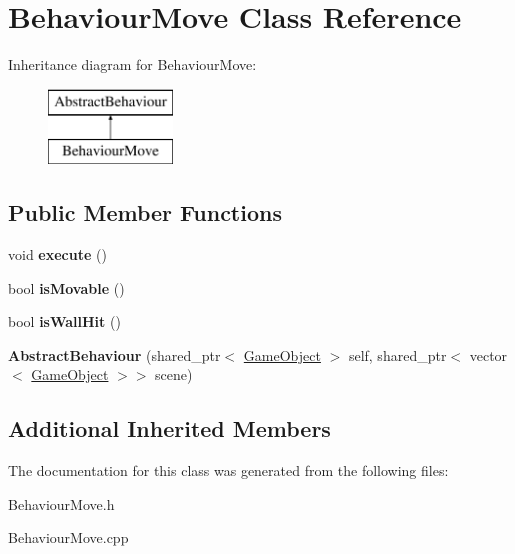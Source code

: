 \hypertarget{class_behaviour_move}{}\section{Behaviour\+Move Class Reference}
\label{class_behaviour_move}
Inheritance diagram for Behaviour\+Move\+:\begin{figure}[H]
\begin{center}
\leavevmode
\includegraphics[height=2.000000cm]{class_behaviour_move}
\end{center}
\end{figure}
\subsection*{Public Member Functions}
\begin{DoxyCompactItemize}
\item 
\mbox{\label{class_behaviour_move_a4cccd6dbe5ccf37b1522fc71a807f080}} 
void {\bfseries execute} ()
\item 
\mbox{\label{class_behaviour_move_a3d4182913183e85af80a1eba69a457a1}} 
bool {\bfseries is\+Movable} ()
\item 
\mbox{\label{class_behaviour_move_aebfd734f768321735b20f4e66ea1faab}} 
bool {\bfseries is\+Wall\+Hit} ()
\item 
\mbox{\label{class_behaviour_move_a8a3a9217b3179f949a1d6a32f340c00c}} 
{\bfseries Abstract\+Behaviour} (shared\+\_\+ptr$<$ \mbox{\hyperlink{class_game_object}{Game\+Object}} $>$ self, shared\+\_\+ptr$<$ vector$<$ \mbox{\hyperlink{class_game_object}{Game\+Object}} $>$$>$ scene)
\end{DoxyCompactItemize}
\subsection*{Additional Inherited Members}


The documentation for this class was generated from the following files\+:\begin{DoxyCompactItemize}
\item 
Behaviour\+Move.\+h\item 
Behaviour\+Move.\+cpp\end{DoxyCompactItemize}
